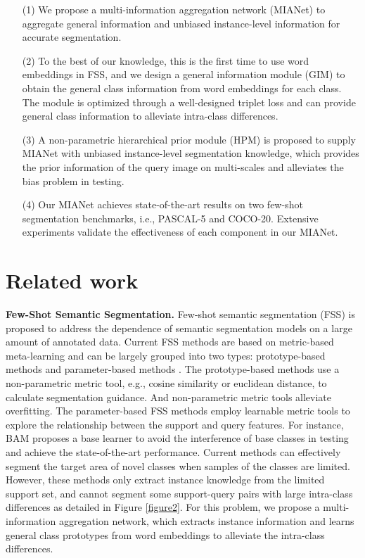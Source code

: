 \documentclass[10pt,twocolumn,letterpaper]{article}
\begin{document}
\begin{itemize}[itemsep=1pt,topsep=0pt,parsep=0pt]
	\item [(1)] We propose a multi-information aggregation network (MIANet) to aggregate general information and unbiased instance-level information for accurate segmentation. 
	\item [(2)] To the best of our knowledge, this is the first time to use word embeddings in FSS, and we design a general information module (GIM) to obtain the general class information from word embeddings for each class. The module is optimized through a well-designed triplet loss and can provide general class information to alleviate intra-class differences.
	\item [(3)] A non-parametric hierarchical prior module (HPM) is proposed to supply MIANet with unbiased instance-level segmentation knowledge, which provides the prior information of the query image on multi-scales and alleviates the bias problem in testing.
	\item [(4)] Our MIANet achieves state-of-the-art results on two few-shot segmentation benchmarks, i.e., PASCAL-5 and COCO-20. Extensive experiments validate the effectiveness of each component in our MIANet.
\end{itemize}

\section{Related work}
\noindent\textbf{Few-Shot Semantic Segmentation.} Few-shot semantic segmentation (FSS) is proposed to address the dependence of semantic segmentation models on a large amount of annotated data. Current FSS methods are based on metric-based meta-learning and can be largely grouped into two types: prototype-based methods \cite{panet,mlc,ppnet,sgone, pl, apla} and parameter-based methods \cite{sagnn, cytrans, bam, crnet,self,metaclass}. The prototype-based methods use a non-parametric metric tool, e.g., cosine similarity or euclidean distance, to calculate segmentation guidance. And non-parametric metric tools alleviate overfitting. The parameter-based FSS methods employ learnable metric tools to explore the relationship between the support and query features. For instance, BAM \cite{bam} proposes a base learner to avoid the interference of base classes in testing and achieve the state-of-the-art performance. Current methods can effectively segment the target area of novel classes when samples of the classes are limited. However, these methods only extract instance knowledge from the limited support set, and cannot segment some support-query pairs with large intra-class differences as detailed in Figure \ref{figure2}. For this problem, we propose a multi-information aggregation network, which extracts instance information and learns general class prototypes from word embeddings to alleviate the intra-class differences.\par
\end{document}
